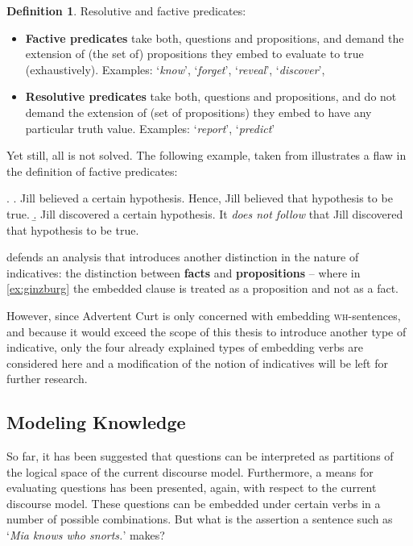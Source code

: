 \documentclass[notitlepage,twoside,a4paper]{scrreprt}
\newcommand{\term}[1]{\textsf{\textbf{#1}}} %
\newcommand{\pn}{\textsf} %
\newcommand{\example}[1]{`\textit{#1}'} %
\newcommand{\wh}{\textsc{wh}}
\newcommand{\acurt}{\pn{Advertent Curt}}
\theoremstyle{remark}
\theoremstyle{remark}
\theoremstyle{definition}
\newtheorem{definition}[thm]{Definition}
\theoremstyle{definition}
\begin{document}
\begin{definition}\label{def:embed2}
  Resolutive and factive predicates:
  \begin{itemize}
  \item \term{Factive predicates} take both, questions and propositions, and
  demand the extension of (the set of) propositions they embed to evaluate to true (exhaustively).
  Examples:
  \example{know}, \example{forget}, \example{reveal}, \example{discover},
  \item \term{Resolutive predicates} take both, questions and propositions, and
  do not demand the extension of (set of propositions) they embed to have any particular truth value.
  Examples:
  \example{report}, \example{predict}
  \end{itemize}
\end{definition}

Yet still, all is not solved. The following example, taken from \cite[example
(27)]{ginzburg} illustrates a flaw in the definition of factive predicates:

\ex. 
\a. Jill believed a certain hypothesis. Hence, Jill believed that hypothesis
to be true.
\b. \label{ex:ginzburg}Jill discovered a certain hypothesis. It \emph{does not follow} that Jill
discovered that hypothesis to be true. 

\cite{ginzburg} defends an analysis that
introduces another distinction in the nature of indicatives: the distinction
between \term{facts} and \term{propositions} -- where in \ref{ex:ginzburg} the
embedded clause is treated as a proposition and not as a fact.

However, since \acurt{} is only concerned with embedding \wh-sentences, and
because it would exceed the scope of this thesis to introduce another type of
indicative, only the four already explained types of embedding verbs are 
considered here and a modification of the notion of indicatives will be left for
further research.

\subsection{Modeling Knowledge}\label{sec:epistemic}

So far, it has been suggested that questions can be interpreted as partitions of
the logical space of the current discourse model. Furthermore, a means for
evaluating questions has been presented, again, with respect to the current
discourse model. These questions can be embedded under certain verbs in a number
of possible combinations. But what is the assertion a sentence such as \example{Mia
knows who snorts.} makes?
\end{document}
